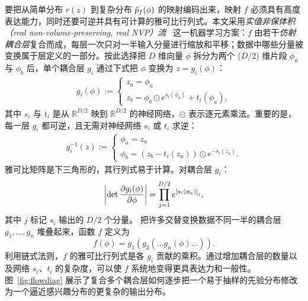 %
要把从简单分布 $r(z)$ 到复杂分布 $\tilde{p}_f(\phi)$ 的映射编码出来，映射 $f$ 必须具有高度表达能力，同时还要可逆并具有可计算的雅可比行列式。本文采用{\it 实值非保体积（real non-volume-preserving, real NVP）流}~\cite{Dinh2016} 这一机器学习方案：$f$ 由若干{\it 仿射耦合层}复合而成，每层一次只对一半输入分量进行缩放和平移；数据中哪些分量被变换属于层定义的一部分。按此选择把 $D$ 维向量 $\phi$ 拆分为两个 ($D/2$) 维片段 $\phi_a$ 与 $\phi_b$ 后，单个耦合层 $g_i$ 通过下式把 $\phi$ 变换为 $z = g_i (\phi)$：
%
\begin{align}\label{eq:affinecoupling}
    g_i(\phi) := \begin{cases}
    z_a = \phi_a  \\
    z_b = \phi_b \odot e^{s_i(\phi_a)} + t_i(\phi_a),
    \end{cases}
\end{align}
%
其中 $s_i$ 与 $t_i$ 是从 $\mathbb{R}^{D/2}$ 映到 $\mathbb{R}^{D/2}$ 的神经网络，$\odot$ 表示逐元素乘法。重要的是，每一层 $g_i$ 都可逆，且无需对神经网络 $s_i$ 或 $t_i$ 求逆：
%
\begin{align}\label{eq:inv-affine-coupling}
    g_i^{-1}(z) := \begin{cases}
    \phi_a = z_a  \\
    \phi_b = (z_b - t_i(z_a)) \odot e^{-s_i(z_a)}.
    \end{cases}
\end{align}
%
雅可比矩阵是下三角形的，其行列式易于计算。对耦合层 $g_i$：
%
\begin{equation}
    \left| \det \frac{\partial g_i(\phi)}{\partial \phi} \right| = \prod_{j=1}^{D/2} e^{\left[ s_i(\phi_a) \right]_j},
\end{equation}
其中 $j$ 标记 $s_i$ 输出的 $D/2$ 个分量。
%
把许多交替变换数据不同一半的耦合层 $g_1, \dots, g_n$ 堆叠起来，函数 $f$ 定义为
%
\begin{equation}
    f(\phi) = g_1 (g_2 ( \dots g_{n} (\phi) \dots ) ).
\end{equation}
%
利用链式法则，$f$ 的雅可比行列式是各 $g_i$ 贡献的乘积。通过增加耦合层的数量以及网络 $s_i$、$t_i$ 的复杂度，可以使 $f$ 系统地变得更具表达力和一般性。图~\ref{fig:flowdiag} 展示了复合多个耦合层如何逐步把一个易于抽样的先验分布修改为一个逼近感兴趣分布的更复杂的输出分布。

